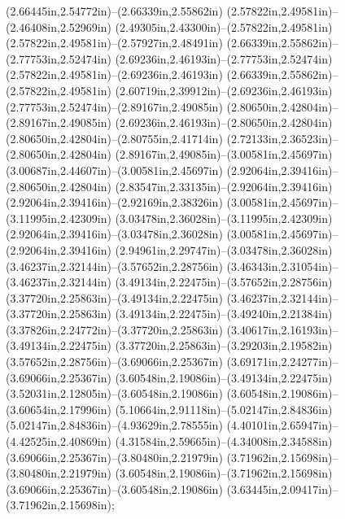 (2.66445in,2.54772in)--(2.66339in,2.55862in) (2.57822in,2.49581in)--(2.46408in,2.52969in) (2.49305in,2.43300in)--(2.57822in,2.49581in) (2.57822in,2.49581in)--(2.57927in,2.48491in) (2.66339in,2.55862in)--(2.77753in,2.52474in) (2.69236in,2.46193in)--(2.77753in,2.52474in) (2.57822in,2.49581in)--(2.69236in,2.46193in) (2.66339in,2.55862in)--(2.57822in,2.49581in) (2.60719in,2.39912in)--(2.69236in,2.46193in) (2.77753in,2.52474in)--(2.89167in,2.49085in) (2.80650in,2.42804in)--(2.89167in,2.49085in) (2.69236in,2.46193in)--(2.80650in,2.42804in) (2.80650in,2.42804in)--(2.80755in,2.41714in) (2.72133in,2.36523in)--(2.80650in,2.42804in) (2.89167in,2.49085in)--(3.00581in,2.45697in) (3.00687in,2.44607in)--(3.00581in,2.45697in) (2.92064in,2.39416in)--(2.80650in,2.42804in) (2.83547in,2.33135in)--(2.92064in,2.39416in) (2.92064in,2.39416in)--(2.92169in,2.38326in) (3.00581in,2.45697in)--(3.11995in,2.42309in) (3.03478in,2.36028in)--(3.11995in,2.42309in) (2.92064in,2.39416in)--(3.03478in,2.36028in) (3.00581in,2.45697in)--(2.92064in,2.39416in) (2.94961in,2.29747in)--(3.03478in,2.36028in) (3.46237in,2.32144in)--(3.57652in,2.28756in) (3.46343in,2.31054in)--(3.46237in,2.32144in) (3.49134in,2.22475in)--(3.57652in,2.28756in) (3.37720in,2.25863in)--(3.49134in,2.22475in) (3.46237in,2.32144in)--(3.37720in,2.25863in) (3.49134in,2.22475in)--(3.49240in,2.21384in) (3.37826in,2.24772in)--(3.37720in,2.25863in) (3.40617in,2.16193in)--(3.49134in,2.22475in) (3.37720in,2.25863in)--(3.29203in,2.19582in) (3.57652in,2.28756in)--(3.69066in,2.25367in) (3.69171in,2.24277in)--(3.69066in,2.25367in) (3.60548in,2.19086in)--(3.49134in,2.22475in) (3.52031in,2.12805in)--(3.60548in,2.19086in) (3.60548in,2.19086in)--(3.60654in,2.17996in) (5.10664in,2.91118in)--(5.02147in,2.84836in) (5.02147in,2.84836in)--(4.93629in,2.78555in) (4.40101in,2.65947in)--(4.42525in,2.40869in) (4.31584in,2.59665in)--(4.34008in,2.34588in) (3.69066in,2.25367in)--(3.80480in,2.21979in) (3.71962in,2.15698in)--(3.80480in,2.21979in) (3.60548in,2.19086in)--(3.71962in,2.15698in) (3.69066in,2.25367in)--(3.60548in,2.19086in) (3.63445in,2.09417in)--(3.71962in,2.15698in);
